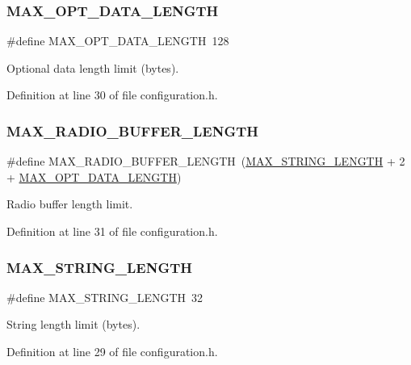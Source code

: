 \subsubsection{\texorpdfstring{M\+A\+X\+\_\+\+O\+P\+T\+\_\+\+D\+A\+T\+A\+\_\+\+L\+E\+N\+G\+TH}{MAX\_OPT\_DATA\_LENGTH}}
{\footnotesize\ttfamily \#define M\+A\+X\+\_\+\+O\+P\+T\+\_\+\+D\+A\+T\+A\+\_\+\+L\+E\+N\+G\+TH~128}

Optional data length limit (bytes). 

Definition at line 30 of file configuration.\+h.

\mbox{\label{group__defines__string__memory__limits_ga03d448ca7b11d1c3e1768aebdda93af2}} 
\subsubsection{\texorpdfstring{M\+A\+X\+\_\+\+R\+A\+D\+I\+O\+\_\+\+B\+U\+F\+F\+E\+R\+\_\+\+L\+E\+N\+G\+TH}{MAX\_RADIO\_BUFFER\_LENGTH}}
{\footnotesize\ttfamily \#define M\+A\+X\+\_\+\+R\+A\+D\+I\+O\+\_\+\+B\+U\+F\+F\+E\+R\+\_\+\+L\+E\+N\+G\+TH~(\hyperlink{group__defines__string__memory__limits_ga6789ebc0df71a8ef76bfbb4fb5f74aad}{M\+A\+X\+\_\+\+S\+T\+R\+I\+N\+G\+\_\+\+L\+E\+N\+G\+TH} + 2 + \hyperlink{group__defines__string__memory__limits_gae4e308c6dc1882b7571c0eef47e07800}{M\+A\+X\+\_\+\+O\+P\+T\+\_\+\+D\+A\+T\+A\+\_\+\+L\+E\+N\+G\+TH})}

Radio buffer length limit. 

Definition at line 31 of file configuration.\+h.

\mbox{\label{group__defines__string__memory__limits_ga6789ebc0df71a8ef76bfbb4fb5f74aad}} 
\subsubsection{\texorpdfstring{M\+A\+X\+\_\+\+S\+T\+R\+I\+N\+G\+\_\+\+L\+E\+N\+G\+TH}{MAX\_STRING\_LENGTH}}
{\footnotesize\ttfamily \#define M\+A\+X\+\_\+\+S\+T\+R\+I\+N\+G\+\_\+\+L\+E\+N\+G\+TH~32}

String length limit (bytes). 

Definition at line 29 of file configuration.\+h.

